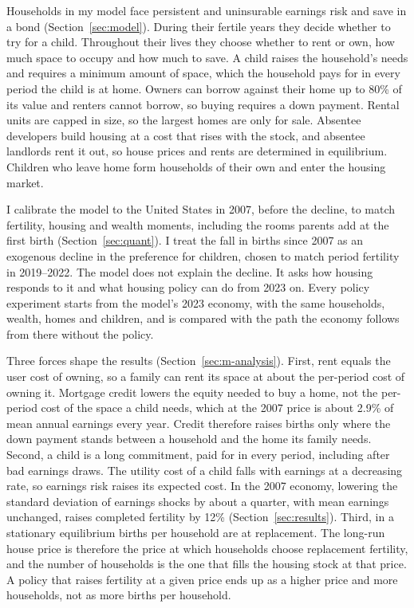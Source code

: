 Households in my model face persistent and uninsurable earnings risk and save
in a bond (Section~\ref{sec:model}). During their fertile years they decide
whether to try for a child. Throughout their lives they choose whether to
rent or own, how much space to occupy and how much to save. A child raises
the household's needs and requires a minimum amount of space, which the
household pays for in every period the child is at home. Owners can borrow
against their home up to 80\% of its value and renters cannot borrow, so
buying requires a down payment. Rental units are capped in size, so the
largest homes are only for sale. Absentee developers build housing at a cost
that rises with the stock, and absentee landlords rent it out, so house
prices and rents are determined in equilibrium. Children who leave home form
households of their own and enter the housing market.

I calibrate the model to the United States in 2007, before the decline, to
match fertility, housing and wealth moments, including the rooms parents add
at the first birth (Section~\ref{sec:quant}). I treat the fall in births since
2007 as an exogenous decline in the preference for children, chosen to match
period fertility in 2019--2022. The model does not explain the decline. It
asks how housing responds to it and what housing policy can do from 2023 on.
Every policy experiment starts from the model's 2023 economy, with the same
households, wealth, homes and children, and is compared with the path the
economy follows from there without the policy.

Three forces shape the results (Section~\ref{sec:m-analysis}). First, rent
equals the user cost of owning, so a family can rent its space at about the
per-period cost of owning it. Mortgage credit lowers the equity needed to buy
a home, not the per-period cost of the space a child needs, which at the
2007 price is about 2.9\% of mean annual earnings every year. Credit
therefore raises births only where the down payment stands between a
household and the home its family needs. Second, a child is a long
commitment, paid for in every period, including after bad earnings draws. The
utility cost of a child falls with earnings at a decreasing rate, so earnings
risk raises its expected cost. In the 2007 economy, lowering the standard
deviation of earnings shocks by about a quarter, with mean earnings
unchanged, raises completed fertility by 12\% (Section~\ref{sec:results}).
Third, in a stationary equilibrium births per household are at replacement.
The long-run house price is therefore the price at which households choose
replacement fertility, and the number of households is the one that fills the
housing stock at that price. A policy that raises fertility at a given price
ends up as a higher price and more households, not as more births per
household.

